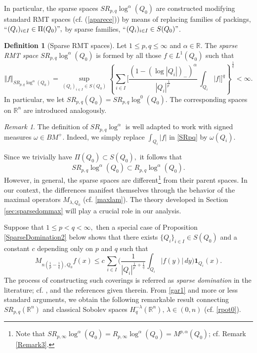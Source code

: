 \documentclass[11pt, a4paper,leqno]{amsart}
\theoremstyle{plain}
\numberwithin{equation}{section}
\theoremstyle{definition}
\newtheorem{definition}{Definition}
\theoremstyle{remark}
\newtheorem{remark}{Remark}
\def\R{\mathbb{R}}
\begin{document}
In particular, the sparse spaces $SR_{p,q}\log^{\alpha}(Q_{0})$ are
constructed modifying standard RMT spaces (cf. (\ref{aparece})) by means of replacing families of
packings, \textquotedblleft$(Q_{i})_{i\in I}\in\Pi(Q_{0})",$ by
sparse families, \textquotedblleft$(Q_{i})_{i\in I}\in S(Q_{0})"$. 


\begin{definition}[Sparse RMT spaces]\label{DefSRMT}
Let $1 \leq p, q \leq \infty$ and $\alpha \in \R$. The \emph{sparse RMT space} $SR_{p,q}\log^{\alpha}(Q_{0})$ is formed by all those $f \in L^1(Q_0)$ such that
\begin{equation}
\Vert f\Vert_{SR_{p,q}\log^{\alpha}(Q_{0})}=\sup_{(Q_{i})_{i\in I}\in
S(Q_{0})}\left\{\sum_{i\in I}\bigg[\frac{(1-(\log|Q_{i}|)_{-})^{\alpha}%
}{|Q_{i}|^{\frac{1}{p^{\prime}}}}\,\int_{Q_{i}}|f|\bigg]^{q}\right\}^{\frac
{1}{q}}<\infty. \label{SRpq}%
\end{equation}
In particular, we let $SR_{p, q}(Q_0) = SR_{p, q} \log^0(Q_0)$. The corresponding spaces on $\R^n$ are introduced analogously. 
\end{definition}

\begin{remark}\label{RemarkMeasures}
	The definition of $SR_{p, q} \log^\alpha$ is well adapted to work with signed measures $\omega \in BM^+$. Indeed, we simply replace $\int_{Q_i} |f|$ in \eqref{SRpq}  by $\omega(Q_i)$. 
\end{remark}

Since we trivially have $\Pi(Q_{0})\subset S(Q_{0}),$ it follows that
\[
SR_{p,q}\log^{\alpha}(Q_{0})\subset R_{p,q}\log^{\alpha}(Q_{0}).
\]
However, in general, the sparse spaces are different\footnote{Note that $SR_{p, \infty} \log^\alpha (Q_0) = R_{p, \infty} \log^\alpha(Q_0) = M^{p, \alpha}(Q_0)$; cf. Remark \ref{Remark3}.} from their parent spaces. In our
context, the differences manifest themselves through the behavior of the maximal operators $M_{\lambda, Q_0}$ (cf. \eqref{maxlam}). The theory developed in Section
\ref{sec:sparsedommax} will play a crucial role in our analysis.



Suppose that $1\leq p<q<\infty,$ then a special case of Proposition
\ref{SparseDomination2} below shows that there exists 
$\{Q_{i}\}_{i\in I} \in S(Q_0)$ and a constant $c$ depending only on $p$ and $q$ such that
\begin{equation}
M_{n(\frac{1}{p}-\frac{1}{q}),Q_{0}}f(x)\leq c \,  \sum_{i\in I}\bigg(\frac
{1}{|Q_{i}|^{\frac{1}{p^{\prime}}+\frac{1}{q}}}\int_{Q_{i}}%
|f(y)|\,dy\bigg)\mathbf{1}_{Q_{i}}(x).\label{gar1}%
\end{equation}
The process of constructing such
coverings is referred as  \emph{sparse
domination} in the literature; cf. \cite{LN19}, \cite{H21} and the references given therein.  
From \eqref{gar1} and more or less standard arguments, we obtain the following  remarkable
result connecting $SR_{p, q}(\R^n)$ and classical Sobolev spaces $H^{-\lambda}_q(\R^n), \, \lambda \in (0, n)$ (cf. \eqref{rpot0}).  
\end{document}
